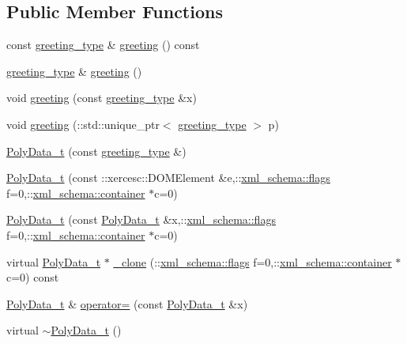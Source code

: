 \subsection*{Public Member Functions}
\begin{DoxyCompactItemize}
\item 
const \hyperlink{classPolyData__t_ae1f86bd7b6a37a0d0851de8a44627177}{greeting\+\_\+type} \& \hyperlink{classPolyData__t_acce3e6cf99db0b383320a0ccfd62789f}{greeting} () const 
\item 
\hyperlink{classPolyData__t_ae1f86bd7b6a37a0d0851de8a44627177}{greeting\+\_\+type} \& \hyperlink{classPolyData__t_a3879d9f3b0b8ae707f1c2465bbbcf507}{greeting} ()
\item 
void \hyperlink{classPolyData__t_a23d6e1490860af1f76f135efb37510e1}{greeting} (const \hyperlink{classPolyData__t_ae1f86bd7b6a37a0d0851de8a44627177}{greeting\+\_\+type} \&x)
\item 
void \hyperlink{classPolyData__t_a25343d3827d7c4049d213c307b491406}{greeting} (\+::std\+::unique\+\_\+ptr$<$ \hyperlink{classPolyData__t_ae1f86bd7b6a37a0d0851de8a44627177}{greeting\+\_\+type} $>$ p)
\item 
\hyperlink{classPolyData__t_a4da6cc1205eee54feaebde53665f0621}{Poly\+Data\+\_\+t} (const \hyperlink{classPolyData__t_ae1f86bd7b6a37a0d0851de8a44627177}{greeting\+\_\+type} \&)
\item 
\hyperlink{classPolyData__t_a47b921cff0546cc9502c008a219d0058}{Poly\+Data\+\_\+t} (const \+::xercesc\+::\+D\+O\+M\+Element \&e,\+::\hyperlink{namespacexml__schema_a0612287d030cb2732d31a45b258fdc87}{xml\+\_\+schema\+::flags} f=0,\+::\hyperlink{namespacexml__schema_ada9aa30dc722e93ee2ed7243085402a5}{xml\+\_\+schema\+::container} $\ast$c=0)
\item 
\hyperlink{classPolyData__t_a6a0cccceec7668fe2f28776a4898a009}{Poly\+Data\+\_\+t} (const \hyperlink{classPolyData__t}{Poly\+Data\+\_\+t} \&x,\+::\hyperlink{namespacexml__schema_a0612287d030cb2732d31a45b258fdc87}{xml\+\_\+schema\+::flags} f=0,\+::\hyperlink{namespacexml__schema_ada9aa30dc722e93ee2ed7243085402a5}{xml\+\_\+schema\+::container} $\ast$c=0)
\item 
virtual \hyperlink{classPolyData__t}{Poly\+Data\+\_\+t} $\ast$ \hyperlink{classPolyData__t_a90079722e663d849db7dec71493ddffe}{\+\_\+clone} (\+::\hyperlink{namespacexml__schema_a0612287d030cb2732d31a45b258fdc87}{xml\+\_\+schema\+::flags} f=0,\+::\hyperlink{namespacexml__schema_ada9aa30dc722e93ee2ed7243085402a5}{xml\+\_\+schema\+::container} $\ast$c=0) const 
\item 
\hyperlink{classPolyData__t}{Poly\+Data\+\_\+t} \& \hyperlink{classPolyData__t_a8fe982e0bf8816c6f50e5d6a6c4a1d84}{operator=} (const \hyperlink{classPolyData__t}{Poly\+Data\+\_\+t} \&x)
\item 
virtual \hyperlink{classPolyData__t_afefe18d998d21a0557e30c06b4089b99}{$\sim$\+Poly\+Data\+\_\+t} ()
\end{DoxyCompactItemize}
